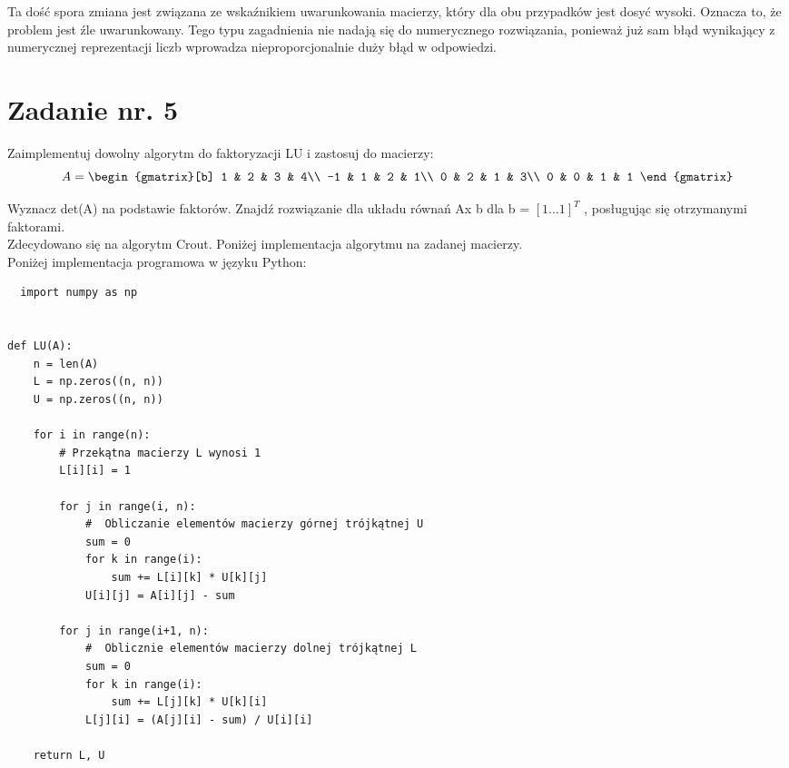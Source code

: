 \documentclass{article}
\begin{document}
Ta dość spora zmiana jest związana ze wskaźnikiem uwarunkowania macierzy, który dla obu przypadków jest dosyć wysoki. Oznacza to, że problem jest źle uwarunkowany. Tego typu zagadnienia nie nadają się do numerycznego rozwiązania, ponieważ już sam błąd wynikający z numerycznej reprezentacji liczb wprowadza nieproporcjonalnie duży błąd w odpowiedzi.
\section{Zadanie nr. 5}
Zaimplementuj dowolny algorytm do faktoryzacji LU i zastosuj do macierzy:
\begin{equation}
  A=
  \begin{gmatrix}[b]
    1 & 2 & 3 & 4\\
    -1 & 1 & 2 & 1\\
    0 & 2 & 1 & 3\\
    0 & 0 & 1 & 1
  \end{gmatrix}
\end{equation}

Wyznacz det(A) na podstawie faktorów. Znajdź rozwiązanie dla układu równań Ax b dla b = $[1...1]^{T}$ , posługując się otrzymanymi faktorami.\\

Zdecydowano się na algorytm Crout. Poniżej implementacja algorytmu na zadanej macierzy.\\


Poniżej implementacja programowa w języku Python:

\begin{lstlisting}
  import numpy as np


def LU(A):
    n = len(A)
    L = np.zeros((n, n))
    U = np.zeros((n, n))

    for i in range(n):
        # Przekątna macierzy L wynosi 1
        L[i][i] = 1

        for j in range(i, n):
            #  Obliczanie elementów macierzy górnej trójkątnej U
            sum = 0
            for k in range(i):
                sum += L[i][k] * U[k][j]
            U[i][j] = A[i][j] - sum

        for j in range(i+1, n):
            #  Oblicznie elementów macierzy dolnej trójkątnej L
            sum = 0
            for k in range(i):
                sum += L[j][k] * U[k][i]
            L[j][i] = (A[j][i] - sum) / U[i][i]

    return L, U

\end{lstlisting}
\end{document}
